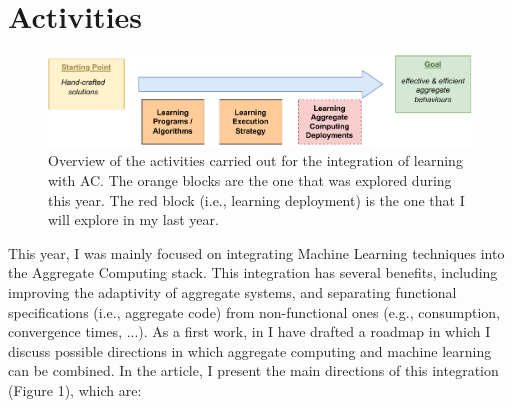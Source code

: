 \documentclass[11pt]{article}
\begin{document}
\section{Activities}
\begin{figure}
	\includegraphics[width=\textwidth]{roadmap.pdf}
	\caption{
		Overview of the activities carried out for the integration of learning with AC. 
		The orange blocks are the one that was explored during this year. 
		The red block (i.e., learning deployment) is the one that I will explore in my last year.
	}
	\label{fig:overview}
\end{figure}
This year, 
 I was mainly focused on integrating Machine Learning techniques into the Aggregate Computing stack.
%
This integration has several benefits, 
 including improving the adaptivity of aggregate systems, 
 and separating functional specifications (i.e., aggregate code) from non-functional ones (e.g., consumption, convergence times, ...).
%
As a first work, in \textit{} I have drafted 
 a roadmap in which I discuss possible directions in which 
 aggregate computing and machine learning can be combined. 
%
In the article, I present the main directions of this integration (Figure 1), which are:
\end{document}

